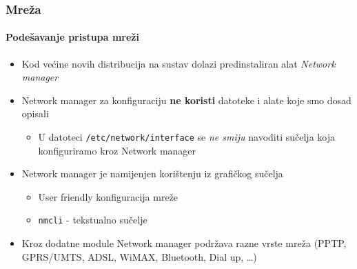 \documentclass[table,usenames,dvipsnames]{beamer}
\newcommand{\shell}[1]{\texttt{#1}}
\begin{document}
\begin{frame}[t]
	\frametitle{Mreža}
	\framesubtitle{Podešavanje pristupa mreži}
	\begin{itemize}
		\item Kod većine novih distribucija na sustav dolazi predinstaliran alat \emph{Network manager}
		\item Network manager za konfiguraciju \textbf{ne koristi} datoteke i alate koje smo dosad opisali
		\begin{itemize}
			\item U datoteci \shell{/etc/network/interface} se \emph{ne smiju} navoditi sučelja koja konfiguriramo kroz Network manager
		\end{itemize}
		\item Network manager je namijenjen korištenju iz grafičkog sučelja
		\begin{itemize}
			\item User friendly konfiguracija mreže
			\item \shell{nmcli} - tekstualno sučelje
		\end{itemize}
		\item Kroz dodatne module Network manager podržava razne vrste mreža {\small (PPTP, GPRS/UMTS, ADSL, WiMAX, Bluetooth, Dial up, \ldots)}
	\end{itemize}
\end{frame}
\end{document}
